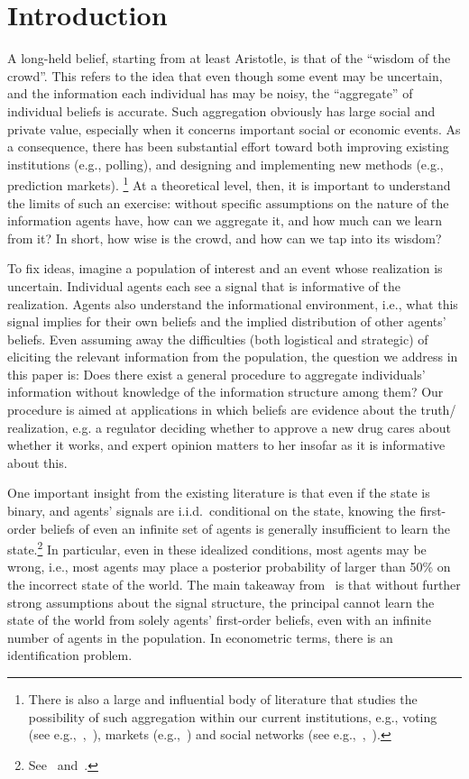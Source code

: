 \documentclass[12pt,reqno]{amsart}
\begin{document}
\section{Introduction}
A long-held belief, starting from at least Aristotle, is that of the ``wisdom of the crowd''. This refers to the idea that even though some event may be uncertain, and the information each individual has may be noisy, the ``aggregate'' of individual beliefs is accurate. Such aggregation obviously has large social and private value, especially when it concerns important social or economic events.
As a consequence, there has been substantial effort toward both improving existing institutions (e.g., polling), and designing and implementing new methods (e.g., prediction markets).%
\footnote{There is also a large and influential body of literature that studies the possibility of such aggregation within our current institutions, e.g., voting (see e.g.,~\cite{austen1996information},~\cite{feddersen1997voting}), markets (e.g.,~\cite{grossman1980impossibility}) and social networks (see e.g.,~\cite{golub2010naive},~\cite{acemoglu2011bayesian}).}
At a theoretical level, then, it is important to understand the limits of such an exercise: without specific assumptions on the nature of the information agents have, how can we aggregate it, and how much can we learn from it? In short, how wise is the crowd, and how can we tap into its wisdom?

To fix ideas, imagine a population of interest and an event whose realization is uncertain. Individual agents each see a signal that is informative of the realization. Agents also understand the informational environment, i.e., what this signal implies for their own beliefs and the implied distribution of other agents' beliefs. Even assuming away the difficulties (both logistical and strategic) of eliciting the relevant information from the population, the question we address in this paper is: Does there exist a general procedure to aggregate individuals' information without knowledge of the information structure among them? Our procedure is aimed at applications in which beliefs are evidence about the truth/ realization, e.g. a regulator deciding whether to approve a new drug cares about whether it works, and expert opinion matters to her insofar as it is informative about this.

One important insight from the existing literature is that even if the state is binary, and agents' signals are i.i.d.\ conditional on the state, knowing the first-order beliefs of even an infinite set of agents is generally insufficient to learn the state.\footnote{See~\cite{prelec2017solution} and~\cite{arieli2017crowd}.} In particular, even in these idealized conditions, most agents may be wrong, i.e., most agents may place a posterior probability of larger than 50\% on the incorrect state of the world. The main takeaway from~\cite{arieli2017crowd} is that without further strong assumptions about the signal structure, the principal cannot learn the state of the world from solely agents' first-order beliefs, even with an infinite number of agents in the population. In econometric terms, there is an identification problem.
\end{document}
